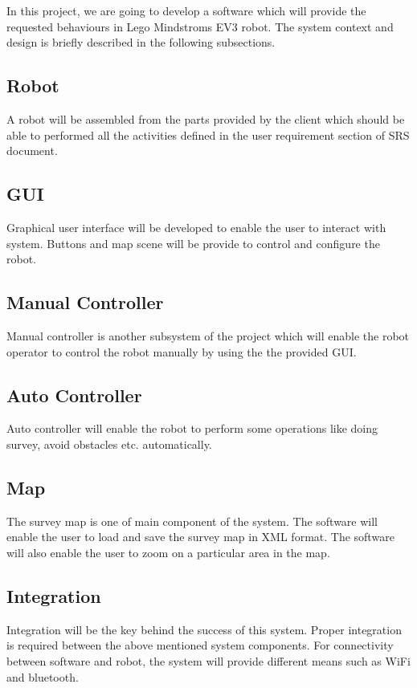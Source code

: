In this project, we are going to develop a software which will provide the requested behaviours in Lego Mindstroms EV3 robot. The system context and design is briefly described in the following subsections.
\subsection{Robot}
A robot will be assembled from the parts provided by the client which should be able to performed all the activities defined in the user requirement section of SRS document. 
\subsection{GUI}
Graphical user interface will be developed to enable the user to interact with system. Buttons and map scene will be provide to control and configure the robot.  
\subsection{Manual Controller}
Manual controller is another subsystem of the project which will enable the robot operator to control the robot manually by using the the provided GUI. 
\subsection{Auto Controller}
Auto controller will enable the robot to perform some operations like doing survey, avoid obstacles etc. automatically. 
\subsection{Map}
The survey map is one of main component of the system. The software will enable the user to load and save the survey map in XML format. The software will also enable the user to zoom on a particular area in the map. 
\subsection{Integration}
Integration will be the key behind the success of this system. Proper integration is required between the above mentioned system components. For connectivity between software and robot, the system will provide different means such as WiFi and bluetooth.  
